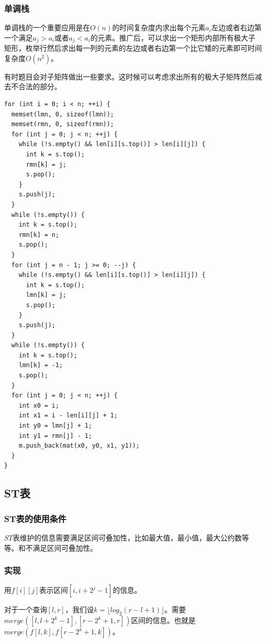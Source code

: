 \documentclass[11pt]{article}
\begin{document}
\subsubsection{单调栈}
\label{sec:orgbb536db}

单调栈的一个重要应用是在\(O(n)\)的时间复杂度内求出每个元素\(a_i\)左边或者右边第一个满足\(a_j > a_i\)或者\(a_j < a_i\)的元素。推广后，可以求出一个矩形内部所有极大子矩形，枚举行然后求出每一列的元素的左边或者右边第一个比它矮的元素即可时间复杂度\(O(n^2)\)。

有时题目会对子矩阵做出一些要求。这时候可以考虑求出所有的极大子矩阵然后减去不合法的部分。

\begin{verbatim}
for (int i = 0; i < n; ++i) {
  memset(lmn, 0, sizeof(lmn));
  memset(rmn, 0, sizeof(rmn));
  for (int j = 0; j < n; ++j) {
    while (!s.empty() && len[i][s.top()] > len[i][j]) {
      int k = s.top();
      rmn[k] = j;
      s.pop();
    }
    s.push(j);
  }
  while (!s.empty()) {
    int k = s.top();
    rmn[k] = n;
    s.pop();
  }
  for (int j = n - 1; j >= 0; --j) {
    while (!s.empty() && len[i][s.top()] > len[i][j]) {
      int k = s.top();
      lmn[k] = j;
      s.pop();
    }
    s.push(j);
  }
  while (!s.empty()) {
    int k = s.top();
    lmn[k] = -1;
    s.pop();
  }
  for (int j = 0; j < n; ++j) {
    int x0 = i;
    int x1 = i - len[i][j] + 1;
    int y0 = lmn[j] + 1;
    int y1 = rmn[j] - 1;
    m.push_back(mat(x0, y0, x1, y1));
  }
}
\end{verbatim}

\subsection{ST表}
\label{sec:org6ae2c8e}

\subsubsection{ST表的使用条件}
\label{sec:orgb64c752}

\(ST\)表维护的信息需要满足区间可叠加性，比如最大值，最小值，最大公约数等等。和不满足区间可叠加性。

\subsubsection{实现}
\label{sec:org493a14d}

用\(f[i][j]\)表示区间\([i,i+2^j-1]\)的信息。

对于一个查询\([l,r]\)，我们设\(k=\lfloor log_2(r-l+1) \rfloor\)。需要\(merge([l,l+2^k -1],[r-2^k+1,r])\)区间的信息。也就是\(merge(f[l,k],f[r-2^k+1,k])\)。
\end{document}
